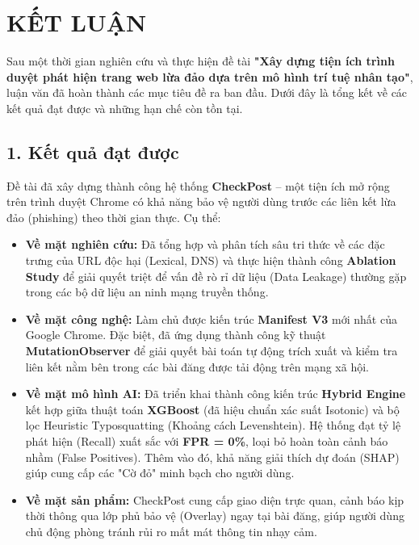 \chapter*{KẾT LUẬN}

Sau một thời gian nghiên cứu và thực hiện đề tài \textbf{"Xây dựng tiện ích trình duyệt phát hiện trang web lừa đảo dựa trên mô hình trí tuệ nhân tạo"}, luận văn đã hoàn thành các mục tiêu đề ra ban đầu. Dưới đây là tổng kết về các kết quả đạt được và những hạn chế còn tồn tại.

\section*{1. Kết quả đạt được}

Đề tài đã xây dựng thành công hệ thống \textbf{CheckPost} – một tiện ích mở rộng trên trình duyệt Chrome có khả năng bảo vệ người dùng trước các liên kết lừa đảo (phishing) theo thời gian thực. Cụ thể:

\begin{itemize}
    \item \textbf{Về mặt nghiên cứu:} Đã tổng hợp và phân tích sâu tri thức về các đặc trưng của URL độc hại (Lexical, DNS) và thực hiện thành công \textbf{Ablation Study} để giải quyết triệt để vấn đề rò rỉ dữ liệu (Data Leakage) thường gặp trong các bộ dữ liệu an ninh mạng truyền thống.
    \item \textbf{Về mặt công nghệ:} Làm chủ được kiến trúc \textbf{Manifest V3} mới nhất của Google Chrome. Đặc biệt, đã ứng dụng thành công kỹ thuật \textbf{MutationObserver} để giải quyết bài toán tự động trích xuất và kiểm tra liên kết nằm bên trong các bài đăng được tải động trên mạng xã hội.
    \item \textbf{Về mặt mô hình AI:} Đã triển khai thành công kiến trúc \textbf{Hybrid Engine} kết hợp giữa thuật toán \textbf{XGBoost} (đã hiệu chuẩn xác suất Isotonic) và bộ lọc Heuristic Typosquatting (Khoảng cách Levenshtein). Hệ thống đạt tỷ lệ phát hiện (Recall) xuất sắc với \textbf{FPR = 0\%}, loại bỏ hoàn toàn cảnh báo nhầm (False Positives). Thêm vào đó, khả năng giải thích dự đoán (SHAP) giúp cung cấp các "Cờ đỏ" minh bạch cho người dùng.
    \item \textbf{Về mặt sản phẩm:} CheckPost cung cấp giao diện trực quan, cảnh báo kịp thời thông qua lớp phủ bảo vệ (Overlay) ngay tại bài đăng, giúp người dùng chủ động phòng tránh rủi ro mất mát thông tin nhạy cảm.
\end{itemize}

